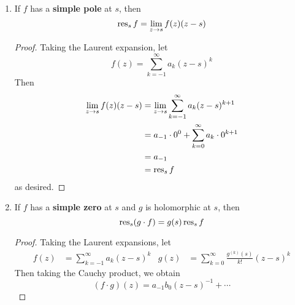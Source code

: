 \documentclass[../notes.tex]{subfiles}
\begin{document}
\begin{itemize}
\begin{enumerate}
        \begin{proof}
            Using the linearity of the integral in the definition, we have
            \begin{align*}
                \res_s(af+g) &= \frac{1}{2\pi i}\int_{\partial D}(af+g)\dd{z}\\
                &= a\cdot\frac{1}{2\pi i}\int_{\partial D}f\dd{z}+\frac{1}{2\pi i}\int_{\partial D}g\dd{z}\\
                &= a\res_sf+\res_sg
            \end{align*}
            as desired.
        \end{proof}
        \item If $f$ has a \textbf{simple pole} at $s$, then
        \begin{equation*}
            \operatorname{res}_sf = \lim_{z\to s}f(z)(z-s)
        \end{equation*}
        \begin{proof}
            Taking the Laurent expansion, let
            \begin{equation*}
                f(z) = \sum_{k=-1}^\infty a_k(z-s)^k
            \end{equation*}
            Then
            \begin{align*}
                \lim_{z\to s}f(z)(z-s) &= \lim_{z\to s}\sum_{k=-1}^\infty a_k(z-s)^{k+1}\\
                &= a_{-1}\cdot 0^0+\sum_{k=0}^\infty a_k\cdot 0^{k+1}\\
                &= a_{-1}\\
                &= \operatorname{res}_sf
            \end{align*}
            as desired.
        \end{proof}
        \item If $f$ has a \textbf{simple zero} at $s$ and $g$ is holomorphic at $s$, then
        \begin{equation*}
            \operatorname{res}_s(g\cdot f) = g(s)\operatorname{res}_sf
        \end{equation*}
        \begin{proof}
            Taking the Laurent expansions, let
            \begin{align*}
                f(z) &= \sum_{k=-1}^\infty a_k(z-s)^k&
                g(z) &= \sum_{k=0}^\infty\frac{g^{(k)}(s)}{k!}(z-s)^k
            \end{align*}
            Then taking the Cauchy product, we obtain
            \begin{equation*}
                (f\cdot g)(z) = a_{-1}b_0(z-s)^{-1}+\cdots

\end{equation*}
\end{proof}
\end{enumerate}
\end{itemize}
\end{document}
